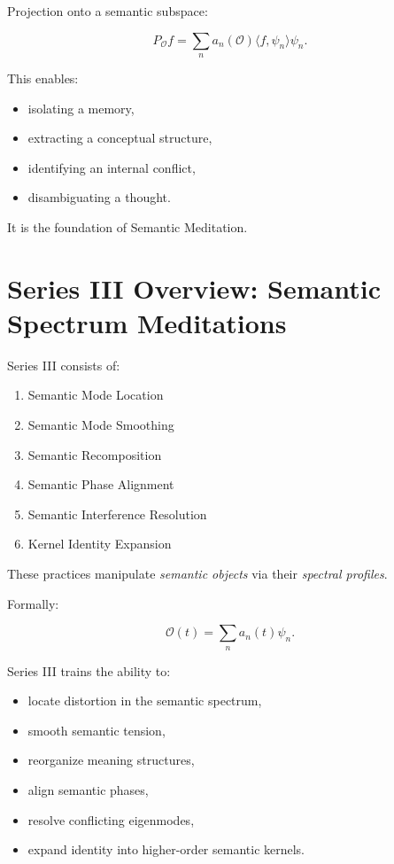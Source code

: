 \documentclass[12pt]{article}
\begin{document}
Projection onto a semantic subspace:

\[
P_{\mathcal{O}} f
    = \sum_n a_n(\mathcal{O}) \langle f, \psi_n\rangle \psi_n.
\]

This enables:

\begin{itemize}
\item isolating a memory,
\item extracting a conceptual structure,
\item identifying an internal conflict,
\item disambiguating a thought.
\end{itemize}

It is the foundation of Semantic Meditation.


\newpage


\chapter{Series III Overview: Semantic Spectrum Meditations}

Series III consists of:

\begin{enumerate}
    \item Semantic Mode Location  
    \item Semantic Mode Smoothing  
    \item Semantic Recomposition  
    \item Semantic Phase Alignment  
    \item Semantic Interference Resolution  
    \item Kernel Identity Expansion  
\end{enumerate}

These practices manipulate \emph{semantic objects} via their \emph{spectral profiles}.

Formally:

\[
\mathcal{O}(t)
    = \sum_n a_n(t)\psi_n.
\]

Series III trains the ability to:

\begin{itemize}
    \item locate distortion in the semantic spectrum,
    \item smooth semantic tension,
    \item reorganize meaning structures,
    \item align semantic phases,
    \item resolve conflicting eigenmodes,
    \item expand identity into higher-order semantic kernels.
\end{itemize}
\end{document}
